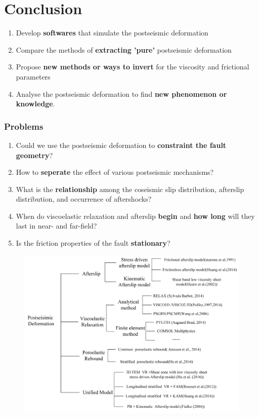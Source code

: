 ﻿\documentclass{beamer}
\begin{document}
\section{Conclusion}
\begin{frame}
\begin{enumerate}
  \item Develop \textbf{softwares} that simulate the postseismic deformation
  \item Compare the methods of \textbf{extracting 'pure'} postseismic deformation
  \item Propose \textbf{new methods or ways to invert} for the viscosity and frictional parameters
  \item Analyse the postseismic deformation to find \textbf{new phenomenon or knowledge}.
\end{enumerate}
\end{frame}

\begin{frame}
\frametitle{Problems}

\begin{enumerate}
  \item Could we use the postseismic deformation to \textbf{constraint the fault geometry}?
  \item How to \textbf{seperate} the effect of various postseismic mechanisms?
  \item What is the \textbf{relationship} among the coseismic slip distribution, afterslip distribution, and occurrence of aftershocks?
  \item When do viscoelastic relaxation and afterslip \textbf{begin} and \textbf{how long} will they last in near- and far-field?
  \item Is the friction properties of the fault \textbf{stationary}?
\end{enumerate}

\end{frame}

\begin{frame}
\begin{figure}
  \centering
  \includegraphics[scale=0.42]{./pic/diagram.jpg}\\
  \caption{}\label{fig_okada}
\end{figure}
\end{frame}
\end{document}
